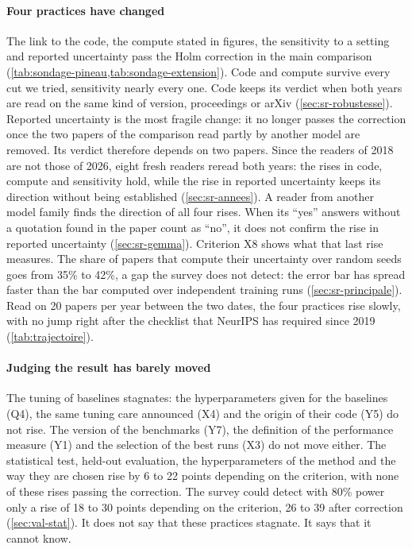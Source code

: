 \paragraph{Four practices have changed} The link to the code, the compute stated in figures, the
sensitivity to a setting and reported uncertainty pass the Holm correction in the main comparison
(\cref{tab:sondage-pineau,tab:sondage-extension}). Code and compute survive every cut we tried,
sensitivity nearly every one. Code keeps its verdict when both years are read on the same kind of
version, proceedings or arXiv (\cref{sec:sr-robustesse}). Reported uncertainty is the most fragile
change: it no longer passes the correction once the two papers of the comparison read partly by
another model are removed. Its verdict therefore depends on two papers. Since the readers of 2018 are
not those of 2026, eight fresh readers reread both years: the rises in code, compute and sensitivity
hold, while the rise in reported uncertainty keeps its direction without being established
(\cref{sec:sr-annees}). A reader from another model family finds the direction of all four rises.
When its \enquote{yes} answers without a quotation found in the paper count as \enquote{no}, it does
not confirm the rise in reported uncertainty (\cref{sec:sr-gemma}). Criterion X8 shows what that last rise
measures. The share of papers that compute their uncertainty
over random seeds goes from 35\% to 42\%, a gap the survey does not detect: the error bar has spread
faster than the bar computed over independent training runs (\cref{sec:sr-principale}). Read on 20
papers per year between the two dates, the four practices rise slowly, with no jump right after the
checklist that NeurIPS has required since 2019 (\cref{tab:trajectoire}).

\paragraph{Judging the result has barely moved} The tuning of baselines stagnates: the hyperparameters given for the
baselines (Q4), the same tuning care announced (X4) and the origin of their code (Y5) do not rise.
The version of the benchmarks (Y7), the definition of the performance measure (Y1) and the selection
of the best runs (X3) do not move either. The statistical test, held-out evaluation, the
hyperparameters of the method and the way they are chosen rise by 6 to 22 points depending on the
criterion, with none of these rises passing the correction. The survey could detect with 80\% power
only a rise of 18 to 30 points depending on the criterion, 26 to 39 after correction
(\cref{sec:val-stat}). It does not say that these practices stagnate. It says
that it cannot know.

